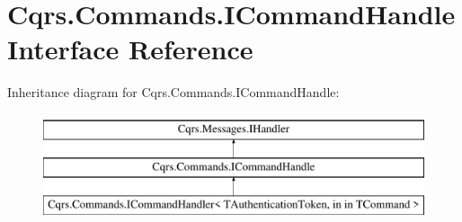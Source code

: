 \hypertarget{interfaceCqrs_1_1Commands_1_1ICommandHandle}{}\section{Cqrs.\+Commands.\+I\+Command\+Handle Interface Reference}
\label{interfaceCqrs_1_1Commands_1_1ICommandHandle}
Inheritance diagram for Cqrs.\+Commands.\+I\+Command\+Handle\+:\begin{figure}[H]
\begin{center}
\leavevmode
\includegraphics[height=3.000000cm]{interfaceCqrs_1_1Commands_1_1ICommandHandle}
\end{center}
\end{figure}
